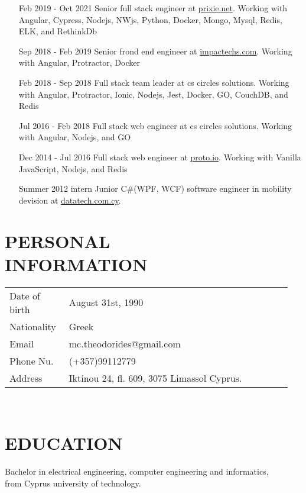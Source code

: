 \documentclass[margin, 11pt]{res} %
\begin{document}
\begin{resume}
\begin{itemize}
            \item[Feb 2019 - Oct 2021] Senior full stack engineer at \href{http://prixie.net}{prixie.net}.
            Working with Angular, Cypress, Nodejs, NWjs, Python, Docker, Mongo, Mysql, Redis, ELK, and RethinkDb

            \item[Sep 2018 - Feb 2019] Senior frond end engineer at \href{http://impactechs.com}{impactechs.com}.
            Working with Angular, Protractor, Docker

            \item[Feb 2018 - Sep 2018] Full stack team leader at cs circles solutions.
            Working with Angular, Protractor, Ionic, Nodejs, Jest, Docker, GO, CouchDB, and Redis

            \item[Jul 2016 - Feb 2018] Full stack web engineer at cs circles solutions.
            Working with Angular, Nodejs, and GO

            \item[Dec 2014 - Jul 2016] Full stack web engineer at \href{https://proto.io/}{proto.io}.
            Working with Vanilla JavaScript, Nodejs, and Redis

            \item[Summer 2012 intern] Junior C\#(WPF, WCF) software engineer in mobility devision at \href{http://www.datatech.com.cy/}{datatech.com.cy}.

        \end{itemize}


        \section{PERSONAL \\ INFORMATION}\label{sec:personalinformation}

        \begin{tabular}{p{0.2\linewidth} p{0.75\linewidth}}

            Date of birth & August 31st, 1990                               \\
            Nationality & Greek                                             \\
            Email & mc.theodorides@gmail.com                                \\
            Phone Nu. & (+357)99112779                                      \\
            Address & Iktinou 24, fl. 609, 3075 Limassol Cyprus.

        \end{tabular}\\

        \section{EDUCATION}\label{sec:education}

        Bachelor in electrical engineering, computer engineering and informatics, \\
        from Cyprus university of technology. \\

    \end{resume}
\end{document}
